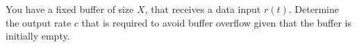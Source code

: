 \begin{problem}
You have a fixed buffer of size $X$, that receives a data input
$r(t)$. Determine the output rate $c$ that is required to avoid
buffer overflow given that the buffer is initially empty.
\end{problem}
